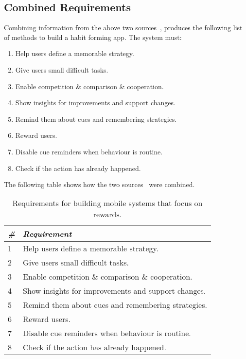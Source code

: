 \subsection{Combined Requirements}
Combining information from the above two sources~\cite{thesis_kathy, article_taxonomy_motivational_affordances_meaningful}, produces the following list of methods to build a habit forming app.\newline
\newline
The system must:

\begin{enumerate}
    \item Help users define a memorable strategy.
    \item Give users small difficult tasks.
    \item Enable competition \& comparison \& cooperation.
    \item Show insights for improvements and support changes.
    \item Remind them about cues and remembering strategies.
    \item Reward users.
    \item Disable cue reminders when behaviour is routine.
    \item Check if the action has already happened.
\end{enumerate}

The following table shows how the two sources~\cite{thesis_kathy, article_taxonomy_motivational_affordances_meaningful} were combined.

\begin{table}
  \centering
  \begin{tabular}{l | l}
    {\small\textit{\#}}
    & {\small \textit{Requirement}}\\
    \midrule
    1 & Help users define a memorable strategy. \\
    2 & Give users small difficult tasks. \\
    3 & Enable competition \& comparison \& cooperation. \\
    4 & Show insights for improvements and support changes. \\
    5 & Remind them about cues and remembering strategies. \\
    6 & Reward users. \\
    7 & Disable cue reminders when behaviour is routine. \\
    8 & Check if the action has already happened. \\
  \end{tabular}
  \caption{Requirements for building mobile systems that focus on rewards.}~\label{tab:requirements_mine}
\end{table}


